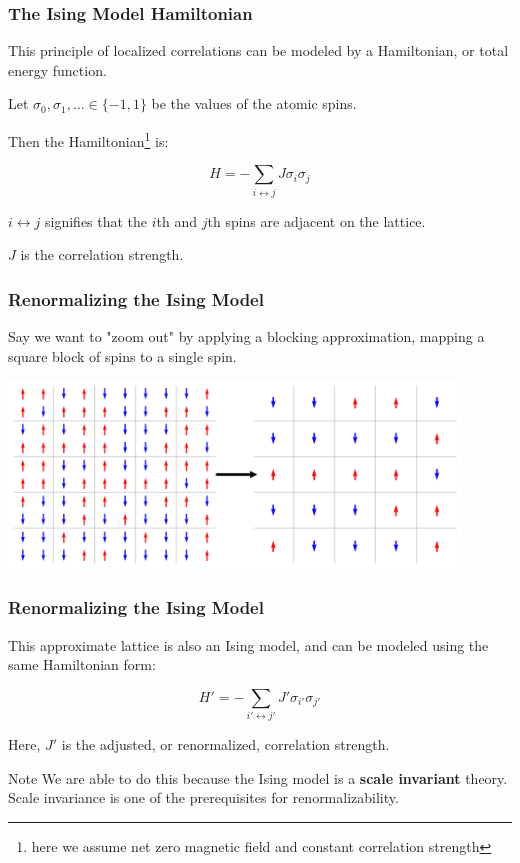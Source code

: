 \documentclass[aspectratio=169, 12pt]{beamer}
\begin{document}
\begin{frame}
    \frametitle{The Ising Model Hamiltonian}

    This principle of localized correlations can be modeled by a Hamiltonian, or total energy function. 

    \vspace{1em}

    Let $\sigma_0, \sigma_1, \dots \in \{-1, 1\}$ be the values of the atomic spins. 

    Then the Hamiltonian\footnote{here we assume net zero magnetic field and constant correlation strength} is:

    \[
    H = -\sum_{i \leftrightarrow j} J \sigma_i \sigma_j
    \]

    $i \leftrightarrow j$ signifies that the $i$th and $j$th spins are adjacent on the lattice. 
    
    $J$ is the correlation strength. 

\end{frame}
    
\begin{frame}

    \frametitle{Renormalizing the Ising Model}

    Say we want to "zoom out" by applying a blocking approximation, mapping a square block of spins to a single spin. 
    \begin{center}
        \includegraphics[width=0.9\textwidth]{images/ising-blocking.png}
    \end{center}
    
\end{frame}

\begin{frame}
    \frametitle{Renormalizing the Ising Model}

    This approximate lattice is also an Ising model, and can be modeled using the same Hamiltonian form:

    \[
    H' = -\sum_{i' \leftrightarrow j'} J' \sigma_{i'} \sigma_{j'}
    \]

    Here, $J'$ is the adjusted, or renormalized, correlation strength. 

    \begin{alertblock}{Note}
        We are able to do this because the Ising model is a \textbf{scale invariant} theory. 
        Scale invariance is one of the prerequisites for renormalizability. 
    \end{alertblock}
     
\end{frame}
\end{document}
